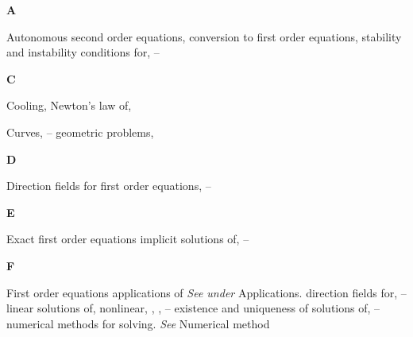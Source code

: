 


\begin{tindex}

\newcommand{\alphsep}[1]{\vspace{12pt}\item{\bfseries #1}}

\alphsep{A}

\item Autonomous second order equations,
\subitem conversion to first order equations, \pageref{eq:4.4.1}
\subitem stability and instability conditions for,
\pageref{eq:4.4.18}--\pageref{exer:4.4.24}


\alphsep{C}

 \item Cooling, Newton's law of, \pageref{eq:1.1.5}

\item Curves, \pageref{example:4.5.1}--\pageref{exer:4.5.34}
\subitem geometric problems, \pageref{example:4.5.7}

\alphsep{D}

\item Direction fields for first order equations,
\pageref{eq:1.3.1}--\pageref{exer:1.3.24}


\alphsep{E}


\item Exact first order equations
\subitem implicit solutions of,
\pageref{example:2.5.1}--\pageref{thmtype:2.5.1}

\alphsep{F}

\item First order equations
\subitem applications of \emph{See under} Applications.
\subitem direction fields for, \pageref{eq:1.3.1}--\pageref{figure:1.3.7}
\subitem linear
\subsubitem solutions of, \pageref{eq:2.1.2}
\subitem nonlinear, \pageref{exer:2.1.2}, \pageref{example:2.2.6},
\pageref{thmtype:2.3.1}--\pageref{exer:2.4.58}
\subsubitem existence and uniqueness of solutions of,
\pageref{thmtype:2.3.1}--\pageref{exer:2.3.21}
\subitem numerical methods for solving. \emph{See} Numerical method


\end{tindex}
